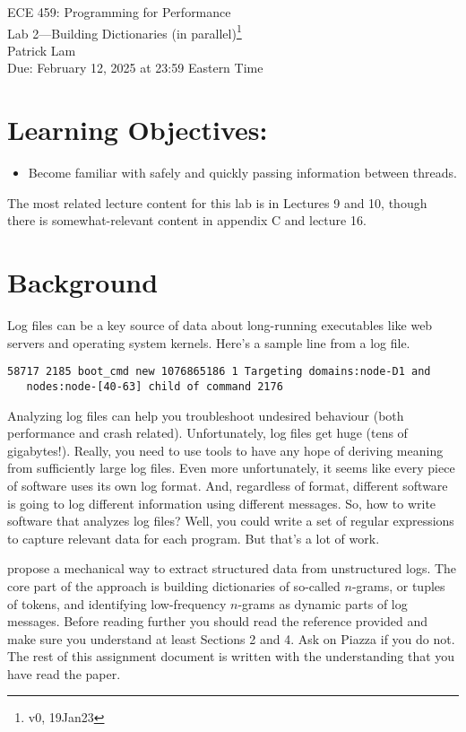 \documentclass[12pt]{article}
\renewcommand{\_}{\kern-1.5pt\textunderscore\kern-1.5pt}
\begin{document}
\begin{center}
{\Large ECE 459: Programming for Performance}\\
{\Large Lab 2---Building Dictionaries (in parallel)\footnote{v0, 19Jan23}}\\[1em]
Patrick Lam\\
Due: February 12, 2025 at 23:59 Eastern Time
\end{center}

\section*{Learning Objectives:}

\begin{itemize}[noitemsep]
	\item Become familiar with safely and quickly passing information between threads.
\end{itemize}

The most related lecture content for this lab is in Lectures 9 and 10, though there is somewhat-relevant content in appendix C and lecture 16.

\section*{Background}
Log files can be a key source of data about long-running executables like web servers and operating system kernels. Here's a sample line from a log file.

\begin{verbatim}
58717 2185 boot_cmd new 1076865186 1 Targeting domains:node-D1 and
   nodes:node-[40-63] child of command 2176
\end{verbatim}

Analyzing log files can help you troubleshoot undesired behaviour (both performance and crash related). Unfortunately, log files get huge (tens of gigabytes!). Really, you need to use tools to have any hope of deriving meaning from sufficiently large log files. Even more unfortunately, it seems like every piece of software uses its own log format. And, regardless of format, different software is going to log different information using different messages. So, how to write software that analyzes log files? Well, you could write a set of regular expressions to capture relevant data for each program. But that's a lot of work.

\cite{dai22} propose a mechanical way to extract structured data from unstructured logs. The core part of the approach is building dictionaries of so-called $n$-grams, or tuples of tokens, and identifying low-frequency $n$-grams as dynamic parts of log messages. Before reading further you should read the reference provided and make sure you understand at least Sections 2 and 4. Ask on Piazza if you do not. The rest of this assignment document is written with the understanding that you have read the paper.
\end{document}
